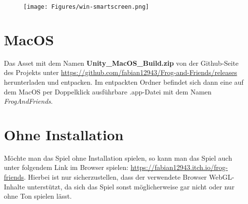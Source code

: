 \begin{figure}[H]
\centering
\texttt{[image: Figures/win-smartscreen.png]}
\end{figure}


\section{MacOS}

Das Asset mit dem Namen \textbf{Unity\_MacOS\_Build.zip} von der Github-Seite des Projekts unter \url{https://github.com/fabian12943/Frog-and-Friends/releases} herunterladen und entpacken. Im entpackten Ordner befindet sich dann eine auf dem MacOS per Doppelklick ausführbare .app-Datei mit dem Namen \textit{FrogAndFriends}.

\section{Ohne Installation}

Möchte man das Spiel ohne Installation spielen, so kann man das Spiel auch unter folgendem Link im Browser spielen: \url{https://fabian12943.itch.io/frog-friends}. Hierbei ist nur sicherzustellen, dass der verwendete Browser WebGL-Inhalte unterstützt, da sich das Spiel sonst möglicherweise gar nicht oder nur ohne Ton spielen lässt. 